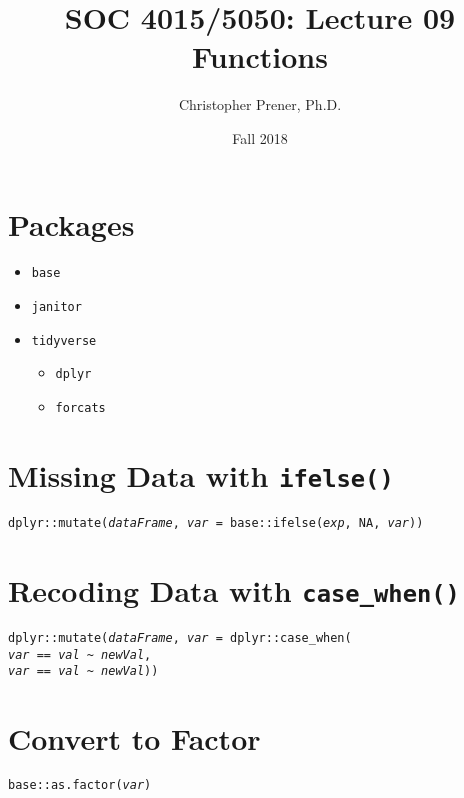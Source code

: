 \documentclass{tufte-handout}
\title{SOC 4015/5050: Lecture 09 Functions}
\author{Christopher Prener, Ph.D.}
\date{Fall 2018}
\begin{document}
\maketitle %

\vspace{5mm}
\section{Packages}
\begin{itemize}
\item \texttt{base}
\item \texttt{janitor}
\item \texttt{tidyverse}
\begin{itemize}
\item \texttt{dplyr}
\item \texttt{forcats}
\end{itemize}
\end{itemize}

\vspace{5mm}
\section{Missing Data with \texttt{ifelse()}}
\noindent \texttt{dplyr::}{\color{red}\texttt{mutate}}\texttt{(\textit{dataFrame}, \textit{var} = base::}{\color{red}\texttt{ifelse}}\texttt{(\textit{exp}, NA, \textit{var}))}

\vspace{5mm}
\section{Recoding Data with \texttt{case\_when()}}
\noindent \texttt{dplyr::}{\color{red}\texttt{mutate}}\texttt{(\textit{dataFrame}, \textit{var} = dplyr::}{\color{red}\texttt{case\_when}}\texttt{( \\ \textit{var} == \textit{val} \textasciitilde{} \textit{newVal}, \\ \textit{var} == \textit{val} \textasciitilde{} \textit{newVal}))}

\vspace{5mm}
\section{Convert to Factor}
\noindent \texttt{base::}{\color{red}\texttt{as.factor}}\texttt{(\textit{var})}
\end{document}
